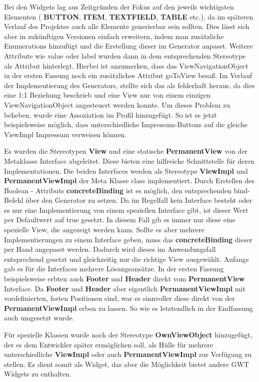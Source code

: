 Bei den Widgets lag aus Zeitgründen der Fokus auf den jeweils wichtigsten Elementen ( \textbf{BUTTON},  \textbf{ITEM},  \textbf{TEXTFIELD},  \textbf{TABLE} etc.), da im späteren Verlauf des Projektes auch alle Elemente generierbar sein sollten. Dies lässt sich aber in zukünftigen Versionen einfach erweitern, indem man zusätzliche Enumerations hinzufügt und die Erstellung dieser im Generator anpasst. 
Weitere Attribute wie value oder label wurden dann in dem entsprechenden Stereotype als Attribut hinterlegt.
Hierbei ist anzumerken, dass das ViewNavigationObject in der ersten Fassung noch ein zusätzliches Attribut goToView besaß. Im Verlauf der Implementierung des Generators, stellte sich das als fehlerhaft heraus, da dies eine 1:1 Beziehung beschrieb und eine View nur von einem einzigen ViewNavigationObject angesteuert werden konnte. Um dieses Problem zu beheben, wurde eine Assoziation im Profil hinzugefügt. So ist es jetzt beispielsweise möglich, dass unterschiedliche Impressum-Buttons auf die gleiche ViewImpl Impressum verweisen können. 

Es wurden die Stereotypen  \textbf{View} und eine statische  \textbf{PermanentView} von der Metaklasse Interface abgeleitet. Diese bieten eine hilfreiche Schnittstelle für deren Implementationen. Die beiden Interfaces werden als Stereotype  \textbf{ViewImpl} und  \textbf{PermanentViewImpl} der Meta Klasse class implementiert. Durch Erstellen des Boolean - Attributs \textbf{concreteBinding} ist es möglich, den entsprechenden bind-Befehl über den Generator zu setzen. Da im Regelfall kein Interface besteht oder es nur eine Implementierung von einem speziellen Interface gibt, ist dieser Wert per Defaultwert auf true gesetzt. In diesem Fall gib es immer nur diese eine spezielle View, die angezeigt werden kann. Sollte es aber mehrere Implementierungen zu einem Interface geben, muss das  \textbf{concreteBinding}  dieser per Hand angepasst werden. Dadurch wird dieses im Anwendungsfall entsprechend gesetzt und gleichzeitig nur die richtige View ausgewählt.
Anfangs gab es für die Interfaces mehrere Lösungsansätze. In der ersten Fassung beispielsweise erbten auch  \textbf{Footer}  und  \textbf{Header}  direkt vom \textbf{PermanentView} Interface. Da  \textbf{Footer} und  \textbf{Header} aber eigentlich \textbf{PermanentViewImpl} mit vordefinierten, festen Positionen sind, war es sinnvoller diese direkt von der \textbf{PermanentViewImpl} erben zu lassen. So wie es letztendlich in der Endfassung auch umgesetzt wurde.  

Für spezielle Klassen wurde noch der Stereotype \textbf{OwnViewObject} hinzugefügt, der es dem Entwickler später ermöglichen soll, als Hülle für mehrere unterschiedliche \textbf{ViewImpl} oder auch \textbf{PermanentViewImpl} zur Verfügung zu stellen. Es dient somit als Widget, das aber die Möglichkeit bietet andere GWT Widgets zu enthalten.


